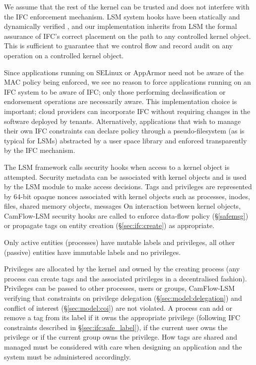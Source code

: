 \documentclass[10pt,journal,compsoc]{IEEEtran}
\begin{document}
We assume that the rest of the kernel can be trusted and does not interfere with the IFC enforcement mechanism.
LSM system hooks have been statically and dynamically verified \cite{edwards2002runtime, jaeger2004consistency, ganapathy2005automatic}, and our implementation inherits from LSM the formal assurance of IFC's correct placement on the path to any controlled kernel object.
This is sufficient to guarantee that we control flow and record audit on any operation on a controlled kernel object.


Since applications running on SELinux \cite{smalley2001implementing} or AppArmor \cite{bauer2006paranoid} need not be aware of the MAC policy being enforced, we see no reason to force applications running on an IFC system to be aware of IFC; only those performing declassification or endorsement operations are necessarily aware. 
This implementation choice is important; cloud providers can incorporate IFC without requiring changes in the software deployed by tenants. Alternatively, applications that wish to manage their own IFC constraints can declare policy through a pseudo-filesystem (as is typical for LSMs) abstracted by a user space library  and enforced transparently by the IFC mechanism.


The LSM framework calls security hooks when access to a kernel object is attempted.
Security metadata can be associated with kernel objects and is used by the LSM module to make access decisions.
Tags and privileges are represented by 64-bit opaque nonces associated with kernel objects such as processes, inodes, files, shared memory objects, messages \etc
On interaction between kernel objects, CamFlow-LSM security hooks are called to enforce data-flow policy (\S\ref{safemsg}) or propagate tags on entity creation (\S\ref{sec:ifc:create}) as appropriate.

Only active entities (processes) have mutable labels and privileges, all other (passive) entities have immutable labels and no privileges. 


Privileges are allocated by the kernel and owned by the creating process (any process can create tags and the associated privileges in a decentralised fashion).
Privileges can be passed to other processes, users or groups, CamFlow-LSM verifying that constraints on privilege delegation (\S\ref{sec:model:delegation}) and conflict of interest (\S\ref{sec:model:coi}) are not violated.
A process
can add or remove a tag from its label if it owns the appropriate privilege (following IFC constraints described in \S\ref{sec:ifc:safe_label}), if the current user owns the privilege or if the current group owns the privilege.
How tags are shared and managed must be considered with care when designing an application and the system 
must be administered accordingly.
\end{document}
